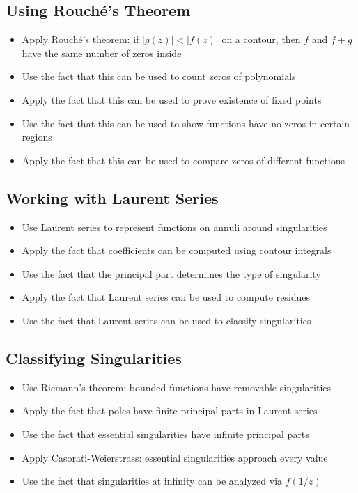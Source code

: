 \subsection*{Using Rouché's Theorem}
\begin{itemize}
\item Apply Rouché's theorem: if $|g(z)| < |f(z)|$ on a contour, then $f$ and $f+g$ have the same number of zeros inside
\item Use the fact that this can be used to count zeros of polynomials
\item Apply the fact that this can be used to prove existence of fixed points
\item Use the fact that this can be used to show functions have no zeros in certain regions
\item Apply the fact that this can be used to compare zeros of different functions
\end{itemize}

\subsection*{Working with Laurent Series}
\begin{itemize}
\item Use Laurent series to represent functions on annuli around singularities
\item Apply the fact that coefficients can be computed using contour integrals
\item Use the fact that the principal part determines the type of singularity
\item Apply the fact that Laurent series can be used to compute residues
\item Use the fact that Laurent series can be used to classify singularities
\end{itemize}

\subsection*{Classifying Singularities}
\begin{itemize}
\item Use Riemann's theorem: bounded functions have removable singularities
\item Apply the fact that poles have finite principal parts in Laurent series
\item Use the fact that essential singularities have infinite principal parts
\item Apply Casorati-Weierstrass: essential singularities approach every value
\item Use the fact that singularities at infinity can be analyzed via $f(1/z)$
\end{itemize}

